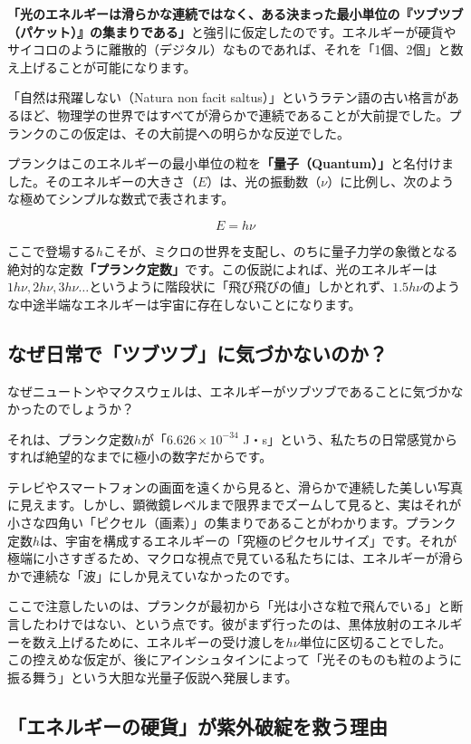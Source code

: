 \textbf{「光のエネルギーは滑らかな連続ではなく、ある決まった最小単位の『ツブツブ（パケット）』の集まりである」}と強引に仮定したのです。エネルギーが硬貨やサイコロのように離散的（デジタル）なものであれば、それを「1個、2個」と数え上げることが可能になります。

「自然は飛躍しない（Natura non facit saltus）」というラテン語の古い格言があるほど、物理学の世界ではすべてが滑らかで連続であることが大前提でした。プランクのこの仮定は、その大前提への明らかな反逆でした。

プランクはこのエネルギーの最小単位の粒を\textbf{「量子（Quantum）」}と名付けました。そのエネルギーの大きさ（\(E\)）は、光の振動数（\(\nu\)）に比例し、次のような極めてシンプルな数式で表されます。

\[E = h\nu\]

ここで登場する\(h\)こそが、ミクロの世界を支配し、のちに量子力学の象徴となる絶対的な定数\textbf{「プランク定数」}です。この仮説によれば、光のエネルギーは\(1h\nu, 2h\nu, 3h\nu \dots\)というように階段状に「飛び飛びの値」しかとれず、\(1.5h\nu\)のような中途半端なエネルギーは宇宙に存在しないことになります。

\subsection{なぜ日常で「ツブツブ」に気づかないのか？}

なぜニュートンやマクスウェルは、エネルギーがツブツブであることに気づかなかったのでしょうか？

それは、プランク定数\(h\)が「\(6.626 \times 10^{-34}\) J・s」という、私たちの日常感覚からすれば絶望的なまでに極小の数字だからです。

テレビやスマートフォンの画面を遠くから見ると、滑らかで連続した美しい写真に見えます。しかし、顕微鏡レベルまで限界までズームして見ると、実はそれが小さな四角い「ピクセル（画素）」の集まりであることがわかります。プランク定数\(h\)は、宇宙を構成するエネルギーの「究極のピクセルサイズ」です。それが極端に小さすぎるため、マクロな視点で見ている私たちには、エネルギーが滑らかで連続な「波」にしか見えていなかったのです。

ここで注意したいのは、プランクが最初から「光は小さな粒で飛んでいる」と断言したわけではない、という点です。彼がまず行ったのは、黒体放射のエネルギーを数え上げるために、エネルギーの受け渡しを\(h\nu\)単位に区切ることでした。この控えめな仮定が、後にアインシュタインによって「光そのものも粒のように振る舞う」という大胆な光量子仮説へ発展します。

\subsection{「エネルギーの硬貨」が紫外破綻を救う理由}

